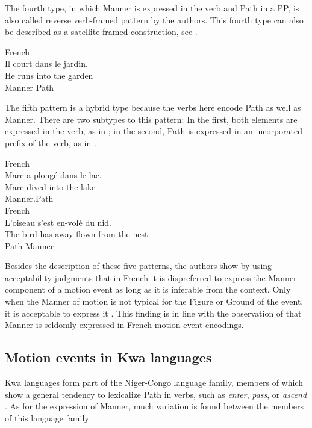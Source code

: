 \documentclass[output=paper,colorlinks,citecolor=brown]{langscibook}
\begin{document}
The fourth type, in which Manner is expressed in the verb and Path in a PP, is also called reverse verb-framed pattern by the authors. This fourth type can also be described as a satellite-framed construction, see .

\ea\label{ex:3:10}French \citep[145]{Pourcel_Kopecka_2005}\\
\glll    Il court dans le jardin.\\
         He runs into  the garden\\
         {} Manner {}  Path \\
\z

The fifth pattern is a hybrid type because the verbs here encode Path as well as Manner. There are two subtypes to this pattern: In the first, both elements are expressed in the verb, as in ; in the second, Path is expressed in an incorporated prefix of the verb, as in . 

\ea\label{ex:3:11}French \citep[146]{Pourcel_Kopecka_2005}\\
\glll    Marc {a plongé dans} le lac.\\
         Marc {dived into} the lake\\
         {}    Manner.Path\\
\ex\label{ex:3:12}French \citep[149]{Pourcel_Kopecka_2005}\\
\glll   L'oiseau   s'est en-volé du nid.  \\
        {The bird} has away-flown from the nest  \\
        {}         {}  Path-Manner\\
\z

Besides the description of these five patterns, the authors show by using acceptability judgments that in French it is dispreferred to express the Manner component of a motion event as long as it is inferable from the context. Only when the Manner of motion is not typical for the Figure or Ground of the event, it is acceptable to express it \citep[148]{Pourcel_Kopecka_2005}. This finding is in line with the observation of \citet{Berthele_2013} that Manner is seldomly expressed in French motion event encodings.

\subsection{Motion events in Kwa languages}

Kwa languages form part of the Niger-Congo language family, members of which show a general tendency to lexicalize Path in verbs, such as \emph{enter}, \emph{pass}, or \emph{ascend} \citep[200--202]{Schaefer_Gaines_1997}. As for the expression of Manner, much variation is found between the members of this language family \citep[209]{Schaefer_Gaines_1997}.
\end{document}
